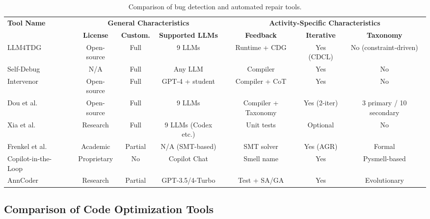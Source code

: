 \documentclass[11pt,a4paper]{article}
\begin{document}
\begin{table}[H]
\centering
\caption{Comparison of bug detection and automated repair tools.}
\label{tab:cmp_repair}
\scriptsize
\begin{tabular}{@{}lcccccc@{}}
\toprule
\multirow{2}{*}{\textbf{Tool Name}} & \multicolumn{3}{c}{\textbf{General Characteristics}} & \multicolumn{3}{c}{\textbf{Activity-Specific Characteristics}} \\
\cmidrule(lr){2-4} \cmidrule(lr){5-7}
 & \textbf{License} & \textbf{Custom.} & \textbf{Supported LLMs} & \textbf{Feedback} & \textbf{Iterative} & \textbf{Taxonomy} \\
\midrule
LLM4TDG~\cite{liu2025llm4tdg} & Open-source & Full & 9 LLMs & Runtime + CDG & Yes (CDCL) & No (constraint‑driven) \\
Self-Debug~\cite{chen2023selfdebug} & N/A & Full & Any LLM & Compiler & Yes & No \\
Intervenor~\cite{wang2024intervenor} & Open-source & Full & GPT-4 + student & Compiler + CoT & Yes & No \\
Dou et al.~\cite{dou2026} & Open-source & Full & 9 LLMs & Compiler + Taxonomy & Yes (2-iter) & 3 primary / 10 secondary \\
Xia et al.~\cite{xia2023apr} & Research & Full & 9 LLMs (Codex etc.) & Unit tests & Optional & No \\
Frenkel et al.~\cite{frenkel2025apr} & Academic & Partial & N/A (SMT-based) & SMT solver & Yes (AGR) & Formal \\
Copilot-in-the-Loop~\cite{zhang2024copilot} & Proprietary & No & Copilot Chat & Smell name & Yes & Pysmell-based \\
AnnCoder~\cite{zhang2025anncoder} & Research & Partial & GPT-3.5/4-Turbo & Test + SA/GA & Yes & Evolutionary \\
\bottomrule
\end{tabular}
\end{table}

\subsection{Comparison of Code Optimization Tools}
\end{document}
